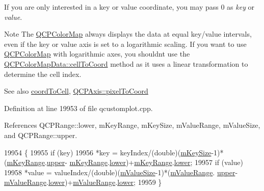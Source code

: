 If you are only interested in a key or value coordinate, you may pass 0 as {\itshape key} or {\itshape value}.

\begin{DoxyNote}{Note}
The \hyperlink{class_q_c_p_color_map}{Q\+C\+P\+Color\+Map} always displays the data at equal key/value intervals, even if the key or value axis is set to a logarithmic scaling. If you want to use \hyperlink{class_q_c_p_color_map}{Q\+C\+P\+Color\+Map} with logarithmic axes, you shouldn\textquotesingle{}t use the \hyperlink{class_q_c_p_color_map_data_ac96d6e84befe7b9951b5da6d4d4a2a47}{Q\+C\+P\+Color\+Map\+Data\+::cell\+To\+Coord} method as it uses a linear transformation to determine the cell index.
\end{DoxyNote}
\begin{DoxySeeAlso}{See also}
\hyperlink{class_q_c_p_color_map_data_a26e33c5ec7094b60136350bcd77d3737}{coord\+To\+Cell}, \hyperlink{class_q_c_p_axis_ae9289ef7043b9d966af88eaa95b037d1}{Q\+C\+P\+Axis\+::pixel\+To\+Coord} 
\end{DoxySeeAlso}


Definition at line 19953 of file qcustomplot.\+cpp.



References Q\+C\+P\+Range\+::lower, m\+Key\+Range, m\+Key\+Size, m\+Value\+Range, m\+Value\+Size, and Q\+C\+P\+Range\+::upper.


\begin{DoxyCode}
19954 \{
19955   \textcolor{keywordflow}{if} (key)
19956     *key = keyIndex/(double)(\hyperlink{class_q_c_p_color_map_data_a354e06462023340fbc03894b22499f6d}{mKeySize}-1)*(\hyperlink{class_q_c_p_color_map_data_aaaafd0d7d0f153dbd152f3daf34254ee}{mKeyRange}.\hyperlink{class_q_c_p_range_ae44eb3aafe1d0e2ed34b499b6d2e074f}{upper}-
      \hyperlink{class_q_c_p_color_map_data_aaaafd0d7d0f153dbd152f3daf34254ee}{mKeyRange}.\hyperlink{class_q_c_p_range_aa3aca3edb14f7ca0c85d912647b91745}{lower})+\hyperlink{class_q_c_p_color_map_data_aaaafd0d7d0f153dbd152f3daf34254ee}{mKeyRange}.\hyperlink{class_q_c_p_range_aa3aca3edb14f7ca0c85d912647b91745}{lower};
19957   if (value)
19958     *value = valueIndex/(double)(\hyperlink{class_q_c_p_color_map_data_ae8ee9093632a59f55eb4fc06579ed256}{mValueSize}-1)*(\hyperlink{class_q_c_p_color_map_data_a225bb96f10c1a27b51ae59249477dbef}{mValueRange}.
      \hyperlink{class_q_c_p_range_ae44eb3aafe1d0e2ed34b499b6d2e074f}{upper}-\hyperlink{class_q_c_p_color_map_data_a225bb96f10c1a27b51ae59249477dbef}{mValueRange}.\hyperlink{class_q_c_p_range_aa3aca3edb14f7ca0c85d912647b91745}{lower})+\hyperlink{class_q_c_p_color_map_data_a225bb96f10c1a27b51ae59249477dbef}{mValueRange}.\hyperlink{class_q_c_p_range_aa3aca3edb14f7ca0c85d912647b91745}{lower};
19959 \}
\end{DoxyCode}
\hypertarget{class_q_c_p_color_map_data_a9910ba830e96955bd5c8e5bef1e77ef3}{}
